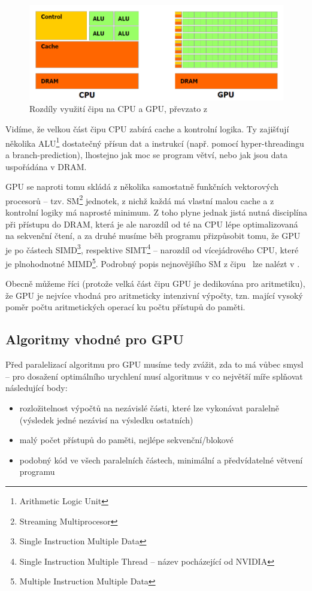         \begin{figure}[h]
          \includegraphics[width = \textwidth]{src/2Gpu/CPUGPU.png}
          \caption{Rozdíly využití čipu na CPU a GPU, převzato z \cite{CUDA programming g.}}
        \end{figure}\label{cpu vs gpu}

        Vidíme, že velkou část čipu CPU zabírá cache a kontrolní logika. Ty zajišťují několika ALU\footnote{Arithmetic Logic Unit} dostatečný přísun dat a instrukcí (např. pomocí hyper-threadingu a branch-prediction), lhostejno jak moc se program větví, nebo jak jsou data uspořádána v DRAM.

        GPU se naproti tomu skládá z několika samostatně funkčních vektorových procesorů -- tzv. SM\footnote{Streaming Multiprocesor} jednotek, z nichž každá má vlastní malou cache a z kontrolní logiky má naprosté minimum. Z toho plyne jednak jistá nutná disciplína při přístupu do DRAM, která je ale narozdíl od té na CPU lépe optimalizovaná na sekvenční čtení, a za druhé musíme běh programu přizpůsobit tomu, že GPU je po částech SIMD\footnote{Single Instruction Multiple Data}, respektive SIMT\footnote{Single Instruction Multiple Thread -- název pocházející od NVIDIA} -- narozdíl od vícejádrového CPU, které je plnohodnotné MIMD\footnote{Multiple Instruction Multiple Data}. Podrobný popis nejnovějšího SM z čipu \FERMI ~lze nalézt v \cite{Fermi}.

        Obecně můžeme říci (protože velká část čipu GPU je dedikována pro aritmetiku), že GPU je nejvíce vhodná pro aritmeticky intenzivní výpočty, tzn. mající vysoký poměr počtu aritmetických operací ku počtu přístupů do paměti.

    \subsection{Algoritmy vhodné pro GPU}

        Před paralelizací algoritmu pro GPU musíme tedy zvážit, zda to má vůbec smysl -- pro dosažení optimálního urychlení musí algoritmus v co největší míře splňovat následující body:
        \begin{itemize}
          \item rozložitelnost výpočtů na nezávislé části, které lze vykonávat paralelně (výsledek jedné nezávisí na výsledku ostatních)
          \item malý počet přístupů do paměti, nejlépe sekvenční/blokové
          \item podobný kód ve všech paralelních částech, minimální a předvídatelné větvení programu
        \end{itemize}

